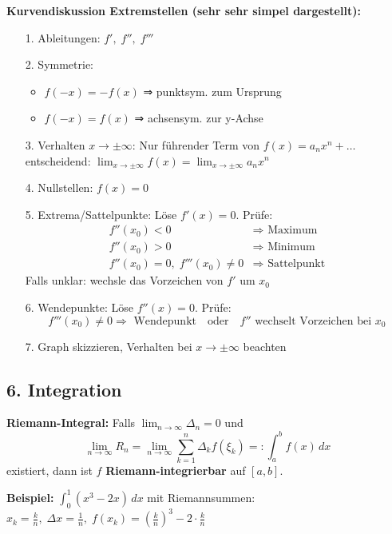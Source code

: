 \begin{itemize}
\textbf{Kurvendiskussion Extremstellen (sehr sehr simpel dargestellt):}
\begin{itemize}
  \item[1.] Ableitungen: \( f',\; f'',\; f''' \)
  \item[2.] Symmetrie:
    \begin{itemize}
      \item \( f(-x) = -f(x) \) ⇒ punktsym. zum Ursprung
      \item \( f(-x) = f(x) \) ⇒ achsensym. zur y-Achse
    \end{itemize}
  \item[3.] Verhalten \( x \to \pm\infty \):  
    Nur führender Term von \( f(x) = a_n x^n + \ldots \) entscheidend:  
    \( \lim_{x \to \pm\infty} f(x) = \lim_{x \to \pm\infty} a_n x^n \)
  \item[4.] Nullstellen: \( f(x) = 0 \)
  \item[5.] Extrema/Sattelpunkte: Löse \( f'(x) = 0 \). Prüfe:
    \[
    \begin{aligned}
      f''(x_0) < 0 &\Rightarrow \text{ Maximum} \\
      f''(x_0) > 0 &\Rightarrow \text{ Minimum} \\
      f''(x_0) = 0,\; f'''(x_0) \neq 0 &\Rightarrow \text{ Sattelpunkt}
    \end{aligned}
    \]
    Falls unklar: wechsle das Vorzeichen von \( f' \) um \( x_0 \)
  \item[6.] Wendepunkte: Löse \( f''(x) = 0 \). Prüfe:
    \[
    f'''(x_0) \neq 0 \Rightarrow \text{ Wendepunkt}
    \quad \text{oder} \quad
    f'' \text{ wechselt Vorzeichen bei } x_0
    \]
  \item[7.] Graph skizzieren, Verhalten bei \( x \to \pm\infty \) beachten
\end{itemize}


\subsection{6. Integration}

\textbf{Riemann-Integral:}  
Falls \( \lim_{n \to \infty} \Delta_n = 0 \) und  
\[
\lim_{n \to \infty} R_n = \lim_{n \to \infty} \sum_{k=1}^{n} \Delta_k f(\xi_k) =: \int_a^b f(x)\,dx
\]
existiert, dann ist \( f \) \textbf{Riemann-integrierbar} auf \( [a,b] \).

\textbf{Beispiel:} \( \displaystyle \int_0^1 (x^3 - 2x)\,dx \) mit Riemannsummen:  
\( x_k = \frac{k}{n},\; \Delta x = \frac{1}{n},\; f(x_k) = \left( \frac{k}{n} \right)^3 - 2 \cdot \frac{k}{n} \)


\end{itemize}
